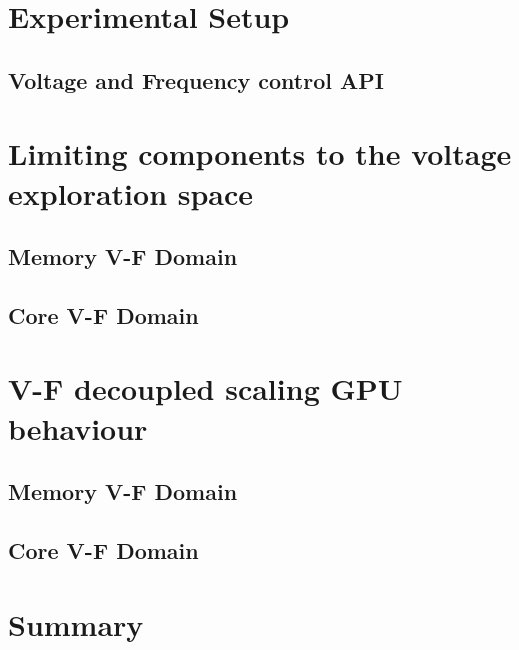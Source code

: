 \section{Experimental Setup}
\subsection{Voltage and Frequency control API}
\section{Limiting components to the voltage exploration space}
\subsection{Memory V-F Domain}
\label{section:memory}


\subsection{Core V-F Domain}
\label{section:core}
\section{V-F decoupled scaling GPU behaviour}
\subsection{Memory V-F Domain}
\label{section:memory}



\subsection{Core V-F Domain}
\label{section:core}
\section{Summary}